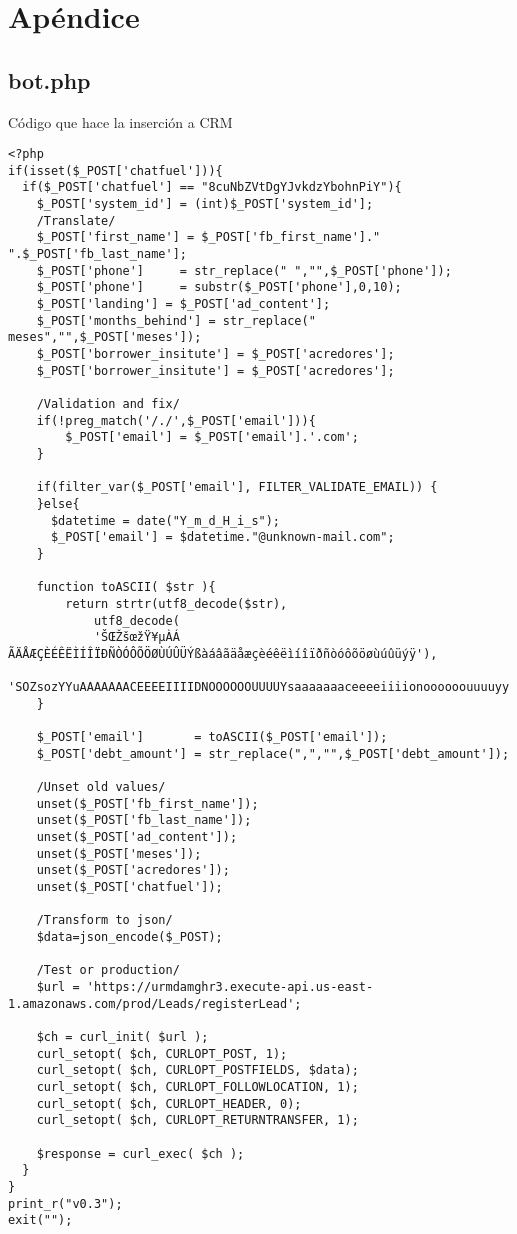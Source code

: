 \chapter{Apéndice}
\section{bot.php}
Código que hace la inserción a CRM
\begin{verbatim}
<?php
if(isset($_POST['chatfuel'])){
  if($_POST['chatfuel'] == "8cuNbZVtDgYJvkdzYbohnPiY"){
    $_POST['system_id'] = (int)$_POST['system_id'];
    /Translate/
    $_POST['first_name'] = $_POST['fb_first_name']." ".$_POST['fb_last_name'];
    $_POST['phone']     = str_replace(" ","",$_POST['phone']);
    $_POST['phone']     = substr($_POST['phone'],0,10);
    $_POST['landing'] = $_POST['ad_content'];
    $_POST['months_behind'] = str_replace(" meses","",$_POST['meses']);
    $_POST['borrower_insitute'] = $_POST['acredores'];
    $_POST['borrower_insitute'] = $_POST['acredores'];

    /Validation and fix/
    if(!preg_match('/./',$_POST['email'])){
        $_POST['email'] = $_POST['email'].'.com';
    }

    if(filter_var($_POST['email'], FILTER_VALIDATE_EMAIL)) {
    }else{
      $datetime = date("Y_m_d_H_i_s");
      $_POST['email'] = $datetime."@unknown-mail.com";
    }

    function toASCII( $str ){
        return strtr(utf8_decode($str), 
            utf8_decode(
            'ŠŒŽšœžŸ¥µÀÁ ÃÄÅÆÇÈÉÊËÌÍÎÏÐÑÒÓÔÕÖØÙÚÛÜÝßàáâãäåæçèéêëìíîïðñòóôõöøùúûüýÿ'),
            'SOZsozYYuAAAAAAACEEEEIIIIDNOOOOOOUUUUYsaaaaaaaceeeeiiiionoooooouuuuyy');
    }

    $_POST['email']       = toASCII($_POST['email']);
    $_POST['debt_amount'] = str_replace(",","",$_POST['debt_amount']);

    /Unset old values/
    unset($_POST['fb_first_name']);
    unset($_POST['fb_last_name']);
    unset($_POST['ad_content']);
    unset($_POST['meses']);
    unset($_POST['acredores']);
    unset($_POST['chatfuel']);

    /Transform to json/
    $data=json_encode($_POST);
    
    /Test or production/
    $url = 'https://urmdamghr3.execute-api.us-east-1.amazonaws.com/prod/Leads/registerLead';

    $ch = curl_init( $url );
    curl_setopt( $ch, CURLOPT_POST, 1);
    curl_setopt( $ch, CURLOPT_POSTFIELDS, $data);
    curl_setopt( $ch, CURLOPT_FOLLOWLOCATION, 1);
    curl_setopt( $ch, CURLOPT_HEADER, 0);
    curl_setopt( $ch, CURLOPT_RETURNTRANSFER, 1);

    $response = curl_exec( $ch );
  }
}
print_r("v0.3");
exit("");\end{verbatim}


